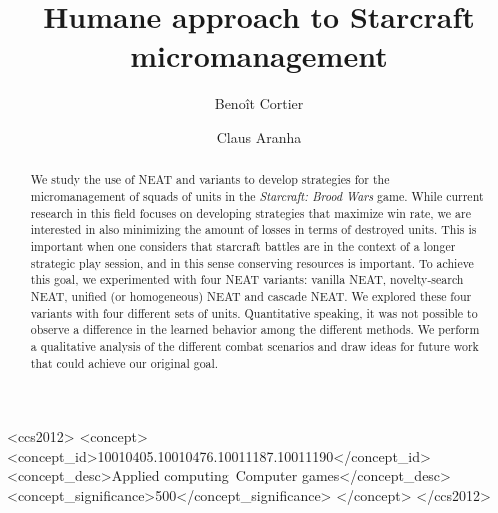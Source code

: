 \documentclass[sigconf, authordraft]{acmart}
\begin{document}
\title{Humane approach to Starcraft micromanagement}

\author{Benoît Cortier}

\author{Claus Aranha}

\begin{abstract}
  We study the use of NEAT and variants to develop strategies for the
  micromanagement of squads of units in the \emph{Starcraft: Brood
    Wars} game. While current research in this field focuses on
  developing strategies that maximize win rate, we are interested in
  also minimizing the amount of losses in terms of destroyed
  units. This is important when one considers that starcraft battles
  are in the context of a longer strategic play session, and in this
  sense conserving resources is important. To achieve this goal, we
  experimented with four NEAT variants: vanilla NEAT, novelty-search
  NEAT, unified (or homogeneous) NEAT and cascade NEAT. We explored
  these four variants with four different sets of units. Quantitative
  speaking, it was not possible to observe a difference in the learned
  behavior among the different methods. We perform a qualitative
  analysis of the different combat scenarios and draw ideas for future
  work that could achieve our original goal.
\end{abstract}

\begin{CCSXML}
<ccs2012>
<concept>
<concept_id>10010405.10010476.10011187.10011190</concept_id>
<concept_desc>Applied computing~Computer games</concept_desc>
<concept_significance>500</concept_significance>
</concept>
</ccs2012>
\end{CCSXML}


\end{document}
